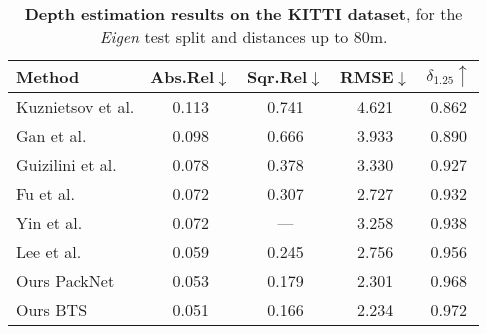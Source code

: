 
\begin{table}[t!]
\renewcommand{\arraystretch}{1.00}
\centering
{
\small
\setlength{\tabcolsep}{0.4em}
\begin{tabular}{l|cccc}
\toprule
Method & 
Abs.Rel$\downarrow$ &
Sqr.Rel$\downarrow$ &
RMSE$\downarrow$ &
$\delta_{1.25}\uparrow$ 
\\
\toprule

Kuznietsov et al. \cite{kuznietsov2017semi}
& 0.113 & 0.741 & 4.621 & 0.862 
\\
Gan et al. \cite{Gan2018MonocularDE}
& 0.098 & 0.666 & 3.933 & 0.890
\\
Guizilini et al. ~\cite{packnet-semisup}
& 0.078 & 0.378 & 3.330 & 0.927 
\\
Fu et al. \cite{fu2018deep}
& 0.072 & 0.307 & 2.727 & 0.932
\\
Yin et al. \cite{Yin2019enforcing}
& 0.072 & --- & 3.258 & 0.938 
\\
Lee et al. ~\cite{lee2019big} 
& 0.059 & 0.245 & 2.756 & 0.956
\\

\midrule

Ours PackNet 
& 0.053 & 0.179 & 2.301 & 0.968
\\
Ours BTS
& 0.051 & 0.166 & 2.234 & 0.972
\\

\bottomrule

\end{tabular}
}
\caption{\textbf{Depth estimation results on the KITTI dataset}, for the \textit{Eigen} test split \cite{eigen2014depth} and distances up to 80m.} 
\label{table:depth_kitti}

\end{table}

